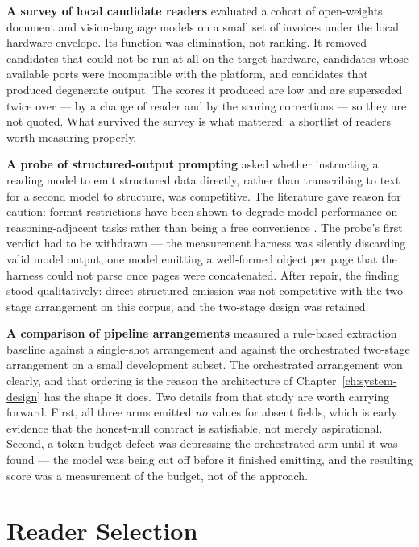 \textbf{A survey of local candidate readers} evaluated a cohort of open-weights document and
vision-language models on a small set of invoices under the local hardware envelope. Its
function was elimination, not ranking. It removed candidates that could not be run at all on
the target hardware, candidates whose available ports were incompatible with the platform, and
candidates that produced degenerate output. The scores it produced are low and are superseded
twice over --- by a change of reader and by the scoring corrections --- so they are not quoted.
What survived the survey is what mattered: a shortlist of readers worth measuring properly.

\textbf{A probe of structured-output prompting} asked whether instructing a reading model to
emit structured data directly, rather than transcribing to text for a second model to structure,
was competitive. The literature gave reason for caution: format restrictions have been shown to
degrade model performance on reasoning-adjacent tasks rather than being a free convenience
\parencite{tam2024format}. The probe's first verdict had to be withdrawn --- the measurement harness
was silently discarding valid model output, one model emitting a well-formed object per page
that the harness could not parse once pages were concatenated. After repair, the finding stood
qualitatively: direct structured emission was not competitive with the two-stage arrangement on
this corpus, and the two-stage design was retained.

\textbf{A comparison of pipeline arrangements} measured a rule-based extraction baseline against
a single-shot arrangement and against the orchestrated two-stage arrangement on a small
development subset. The orchestrated arrangement won clearly, and that ordering is the reason
the architecture of Chapter~\ref{ch:system-design} has the shape it does. Two details from that
study are worth carrying forward. First, all three arms emitted \emph{no} values for absent
fields, which is early evidence that the honest-null contract is satisfiable, not merely
aspirational. Second, a token-budget defect was depressing the orchestrated arm until it was
found --- the model was being cut off before it finished emitting, and the resulting score was a
measurement of the budget, not of the approach.

\section{Reader Selection}
\label{sec:results-reader}

